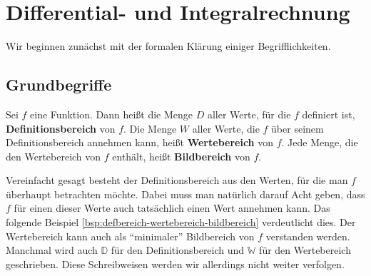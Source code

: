 \chapter{Differential- und Integralrechnung}
Wir beginnen zunächst mit der formalen  Klärung einiger Begrifflichkeiten. 

\section{Grundbegriffe}
\begin{definition}
    Sei \(f\) eine Funktion. Dann heißt die Menge \(D\) aller Werte, für die \(f\) definiert ist, \textbf{Definitionsbereich} von \(f\). Die Menge \(W\) aller Werte, die \(f\) über seinem Definitionsbereich annehmen kann, heißt \textbf{Wertebereich} von \(f\). Jede Menge, die den Wertebereich von \(f\) enthält, heißt \textbf{Bildbereich} von \(f\). 
\end{definition}
Vereinfacht gesagt besteht der Definitionsbereich aus den Werten, für die man \(f\) überhaupt betrachten möchte. Dabei muss man natürlich darauf Acht geben, dass \(f\) für einen dieser Werte auch tatsächlich einen Wert annehmen kann. Das folgende Beispiel \ref{bsp:defbereich-wertebereich-bildbereich} verdeutlicht dies. Der Wertebereich kann auch als "`minimaler"' Bildbereich von \(f\) verstanden werden. Manchmal wird auch \(\mathbb D\) für den Definitionsbereich und \(\mathbb W\) für den Wertebereich geschrieben. Diese Schreibweisen werden wir allerdings nicht weiter verfolgen. 

